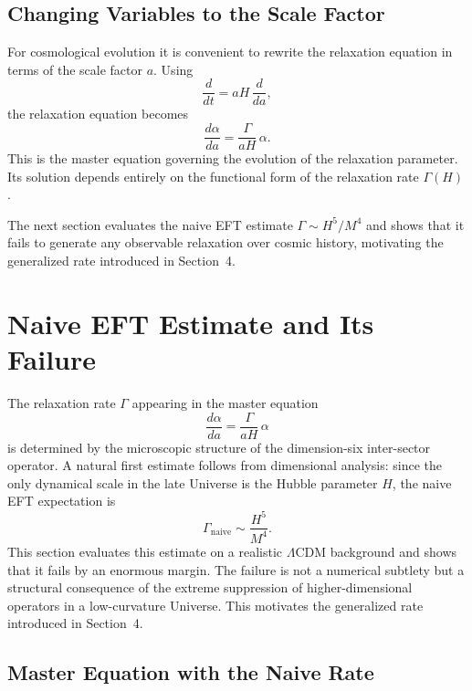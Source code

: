 \documentclass[11pt,a4paper]{article}
\begin{document}
\subsection{Changing Variables to the Scale Factor}

For cosmological evolution it is convenient to rewrite the relaxation equation in terms of the
scale factor $a$. Using
\begin{equation}
    \frac{d}{dt} = aH\,\frac{d}{da},
\end{equation}
the relaxation equation becomes
\begin{equation}
    \frac{d\alpha}{da}
    = \frac{\Gamma}{aH}\,\alpha.
\end{equation}
This is the master equation governing the evolution of the relaxation parameter. Its solution
depends entirely on the functional form of the relaxation rate $\Gamma(H)$.

The next section evaluates the naive EFT estimate $\Gamma \sim H^5/M^4$ and shows that it
fails to generate any observable relaxation over cosmic history, motivating the generalized rate
introduced in Section~4.

\section{Naive EFT Estimate and Its Failure}

The relaxation rate $\Gamma$ appearing in the master equation
\begin{equation}
    \frac{d\alpha}{da}
    = \frac{\Gamma}{aH}\,\alpha
\end{equation}
is determined by the microscopic structure of the dimension-six inter-sector operator. A natural
first estimate follows from dimensional analysis: since the only dynamical scale in the late
Universe is the Hubble parameter $H$, the naive EFT expectation is
\begin{equation}
    \Gamma_{\mathrm{naive}} \sim \frac{H^5}{M^4}.
\end{equation}
This section evaluates this estimate on a realistic $\Lambda$CDM background and shows that it
fails by an enormous margin. The failure is not a numerical subtlety but a structural consequence
of the extreme suppression of higher-dimensional operators in a low-curvature Universe. This
motivates the generalized rate introduced in Section~4.

\subsection{Master Equation with the Naive Rate}
\end{document}

